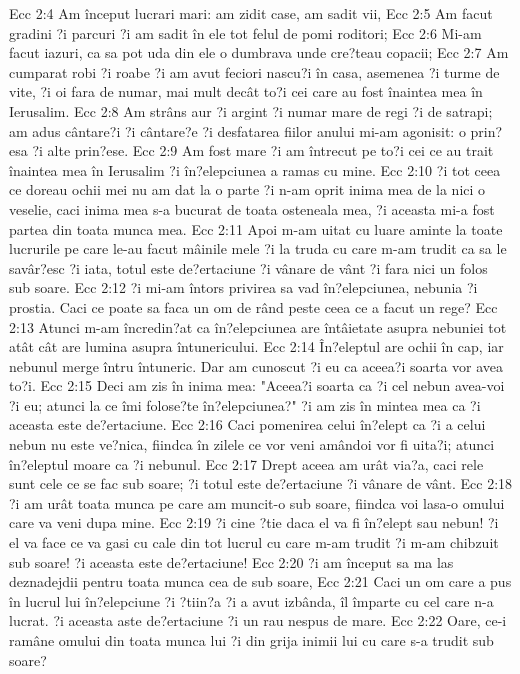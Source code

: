 Ecc 2:4  Am început lucrari mari: am zidit case, am sadit vii,
Ecc 2:5  Am facut gradini ?i parcuri ?i am sadit în ele tot felul de pomi roditori;
Ecc 2:6  Mi-am facut iazuri, ca sa pot uda din ele o dumbrava unde cre?teau copacii;
Ecc 2:7  Am cumparat robi ?i roabe ?i am avut feciori nascu?i în casa, asemenea ?i turme de vite, ?i oi fara de numar, mai mult decât to?i cei care au fost înaintea mea în Ierusalim.
Ecc 2:8  Am strâns aur ?i argint ?i numar mare de regi ?i de satrapi; am adus cântare?i ?i cântare?e ?i desfatarea fiilor anului mi-am agonisit: o prin?esa ?i alte prin?ese.
Ecc 2:9  Am fost mare ?i am întrecut pe to?i cei ce au trait înaintea mea în Ierusalim ?i în?elepciunea a ramas cu mine.
Ecc 2:10  ?i tot ceea ce doreau ochii mei nu am dat la o parte ?i n-am oprit inima mea de la nici o veselie, caci inima mea s-a bucurat de toata osteneala mea, ?i aceasta mi-a fost partea din toata munca mea.
Ecc 2:11  Apoi m-am uitat cu luare aminte la toate lucrurile pe care le-au facut mâinile mele ?i la truda cu care m-am trudit ca sa le savâr?esc ?i iata, totul este de?ertaciune ?i vânare de vânt ?i fara nici un folos sub soare.
Ecc 2:12  ?i mi-am întors privirea sa vad în?elepciunea, nebunia ?i prostia. Caci ce poate sa faca un om de rând peste ceea ce a facut un rege?
Ecc 2:13  Atunci m-am încredin?at ca în?elepciunea are întâietate asupra nebuniei tot atât cât are lumina asupra întunericului.
Ecc 2:14  În?eleptul are ochii în cap, iar nebunul merge întru întuneric. Dar am cunoscut ?i eu ca aceea?i soarta vor avea to?i.
Ecc 2:15  Deci am zis în inima mea: "Aceea?i soarta ca ?i cel nebun avea-voi ?i eu; atunci la ce îmi folose?te în?elepciunea?" ?i am zis în mintea mea ca ?i aceasta este de?ertaciune.
Ecc 2:16  Caci pomenirea celui în?elept ca ?i a celui nebun nu este ve?nica, fiindca în zilele ce vor veni amândoi vor fi uita?i; atunci în?eleptul moare ca ?i nebunul.
Ecc 2:17  Drept aceea am urât via?a, caci rele sunt cele ce se fac sub soare; ?i totul este de?ertaciune ?i vânare de vânt.
Ecc 2:18  ?i am urât toata munca pe care am muncit-o sub soare, fiindca voi lasa-o omului care va veni dupa mine.
Ecc 2:19  ?i cine ?tie daca el va fi în?elept sau nebun! ?i el va face ce va gasi cu cale din tot lucrul cu care m-am trudit ?i m-am chibzuit sub soare! ?i aceasta este de?ertaciune!
Ecc 2:20  ?i am început sa ma las deznadejdii pentru toata munca cea de sub soare,
Ecc 2:21  Caci un om care a pus în lucrul lui în?elepciune ?i ?tiin?a ?i a avut izbânda, îl împarte cu cel care n-a lucrat. ?i aceasta aste de?ertaciune ?i un rau nespus de mare.
Ecc 2:22  Oare, ce-i ramâne omului din toata munca lui ?i din grija inimii lui cu care s-a trudit sub soare?
